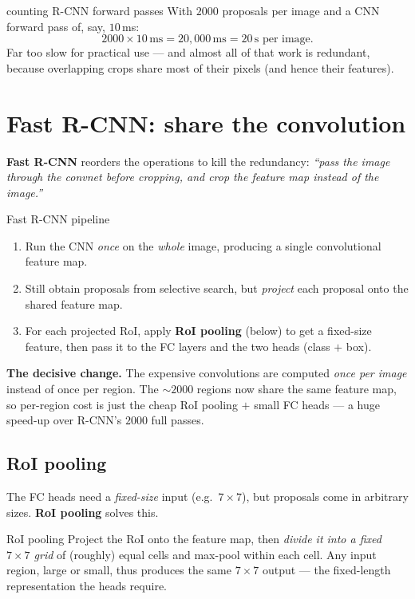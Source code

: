 \documentclass{report}
\begin{document}
\begin{exbox}{counting R-CNN forward passes}
With $2000$ proposals per image and a CNN forward pass of, say, $10$\,ms:
\[
2000 \times 10\,\text{ms} = 20{,}000\,\text{ms} = 20\,\text{s per image}.
\]
Far too slow for practical use --- and almost all of that work is redundant,
because overlapping crops share most of their pixels (and hence their features).
\end{exbox}

\section{Fast R-CNN: share the convolution}

\textbf{Fast R-CNN} reorders the operations to kill the redundancy:
\emph{``pass the image through the convnet \emph{before} cropping, and crop the
\emph{feature map} instead of the image.''}

\begin{defbox}{Fast R-CNN pipeline}
\begin{enumerate}
\item Run the CNN \emph{once} on the \emph{whole} image, producing a single
convolutional feature map.
\item Still obtain proposals from selective search, but \emph{project} each
proposal onto the shared feature map.
\item For each projected RoI, apply \textbf{RoI pooling} (below) to get a
fixed-size feature, then pass it to the FC layers and the two heads (class $+$
box).
\end{enumerate}
\end{defbox}

\begin{keybox}
\textbf{The decisive change.} The expensive convolutions are computed
\emph{once per image} instead of once per region. The $\sim\!2000$ regions now
share the same feature map, so per-region cost is just the cheap RoI pooling
$+$ small FC heads --- a huge speed-up over R-CNN's $2000$ full passes.
\end{keybox}

\subsection{RoI pooling}

The FC heads need a \emph{fixed-size} input (e.g.\ $7\times7$), but proposals
come in arbitrary sizes. \textbf{RoI pooling} solves this.

\begin{defbox}{RoI pooling}
Project the RoI onto the feature map, then \emph{divide it into a fixed
$7\times7$ grid} of (roughly) equal cells and max-pool within each cell. Any
input region, large or small, thus produces the same $7\times7$ output --- the
fixed-length representation the heads require.
\end{defbox}
\end{document}

